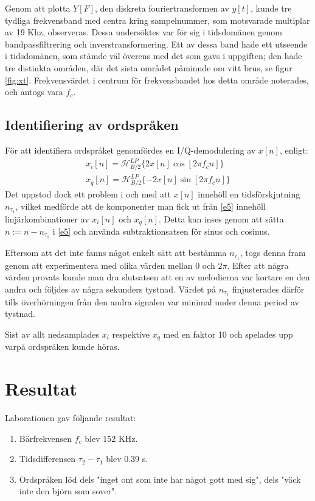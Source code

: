 \documentclass[10pt,twocolumn]{article}
\begin{document}
Genom att plotta $Y[F]$, den diskreta fouriertransformen av $y[t]$, kunde tre tydliga frekvensband med
centra kring sampelnummer, som motsvarade multiplar av 19 Khz, observeras.
Dessa undersöktes var för sig i tidsdomänen genom bandpassfiltrering och inverstransformering. Ett av
dessa band hade ett utseende i tidsdomänen, som stämde väl överens med det som gavs i uppgiften; den
hade tre distinkta områden, där det sista området påminnde om vitt brus, se figur \ref{fig:xt}. Frekvensvärdet i centrum för
frekvensbandet hos detta område noterades, och antogs vara $f_c$.

\subsection{Identifiering av ordspråken}

För att identifiera ordspråket genomfördes en I/Q-demodulering av $x[n]$, enligt:
\begin{multline}
    x_i[n] = \mathcal{H}_{B/2}^{LP} \{ 2 x[n] \cos[2 \pi f_c n] \} \\
    x_q[n] = \mathcal{H}_{B/2}^{LP} \{ -2 x[n] \sin[2 \pi f_c n] \}
    \label{e5}
\end{multline}
Det uppstod dock ett problem i och med att $x[n]$ innehöll en tidsförskjutning $n_{\tau_1}$,
vilket medförde att de komponenter man fick ut från \ref{e5} innehöll
linjärkombinationer av $x_i[n]$ och $x_q[n]$. Detta kan inses genom att sätta $n := n - n_{\tau_1}$
i \ref{e5} och använda subtraktionsatsen för sinus och cosinus.

Eftersom att det inte fanns något enkelt sätt att bestämma $n_{\tau_1}$, togs denna fram genom
att experimentera med olika värden mellan $0$ och $2 \pi$. Efter att några värden provats
kunde man dra slutsatsen att en av melodierna var kortare en den andra och följdes av några
sekunders tystnad. Värdet på $n_{\tau_1}$ finjusterades därför tills överhörningen från den
andra signalen var minimal under denna period av tystnad.

Sist av allt nedsamplades $x_i$ respektive $x_q$ med en faktor 10 och spelades upp varpå
ordspråken kunde höras.
\section{Resultat}

Laborationen gav följande resultat:
\begin{enumerate}
\item Bärfrekvensen $f_c$ blev 152 KHz. 
\item Tidsdifferensen $\tau_2 - \tau_1$ blev 0.39 s.
\item Ordspråken löd dels "inget ont som inte har något gott med sig", dels "väck inte den björn som sover".
\end{enumerate}
\end{document}
